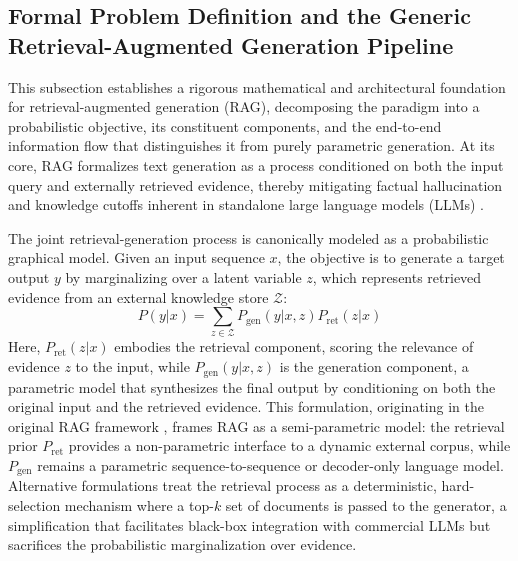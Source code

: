 \documentclass[11pt,a4paper]{article}
\begin{document}
\subsection{Formal Problem Definition and the Generic Retrieval-Augmented Generation Pipeline}


This subsection establishes a rigorous mathematical and architectural foundation for retrieval-augmented generation (RAG), decomposing the paradigm into a probabilistic objective, its constituent components, and the end-to-end information flow that distinguishes it from purely parametric generation. At its core, RAG formalizes text generation as a process conditioned on both the input query and externally retrieved evidence, thereby mitigating factual hallucination and knowledge cutoffs inherent in standalone large language models (LLMs) \cite{arxiv:2005.11401v4,arxiv:2112.04426v3}.

The joint retrieval-generation process is canonically modeled as a probabilistic graphical model. Given an input sequence \( x \), the objective is to generate a target output \( y \) by marginalizing over a latent variable \( z \), which represents retrieved evidence from an external knowledge store \( \mathcal{Z} \):  
\[
P(y|x) = \sum_{z \in \mathcal{Z}} P_{\text{gen}}(y|x, z) P_{\text{ret}}(z|x)
\]  
Here, \( P_{\text{ret}}(z|x) \) embodies the retrieval component, scoring the relevance of evidence \( z \) to the input, while \( P_{\text{gen}}(y|x, z) \) is the generation component, a parametric model that synthesizes the final output by conditioning on both the original input and the retrieved evidence. This formulation, originating in the original RAG framework \cite{arxiv:2005.11401v4}, frames RAG as a semi-parametric model: the retrieval prior \( P_{\text{ret}} \) provides a non-parametric interface to a dynamic external corpus, while \( P_{\text{gen}} \) remains a parametric sequence-to-sequence or decoder-only language model. Alternative formulations treat the retrieval process as a deterministic, hard-selection mechanism where a top-\( k \) set of documents is passed to the generator, a simplification that facilitates black-box integration with commercial LLMs \cite{arxiv:2301.12652v4} but sacrifices the probabilistic marginalization over evidence.
\end{document}
